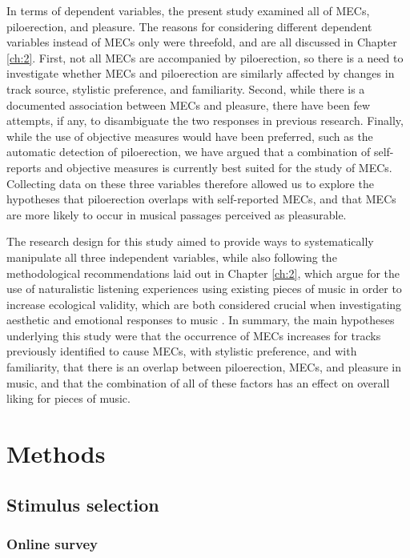 In terms of dependent variables, the present study examined all of MECs, piloerection, and pleasure. The reasons for considering different dependent variables instead of MECs only were threefold, and are all discussed in Chapter \ref{ch:2}. First, not all MECs are accompanied by piloerection, so there is a need to investigate whether MECs and piloerection are similarly affected by changes in track source, stylistic preference, and familiarity. Second, while there is a documented association between MECs and pleasure, there have been few attempts, if any, to disambiguate the two responses in previous research. Finally, while the use of objective measures would have been preferred, such as the automatic detection of piloerection, we have argued that a combination of self-reports and objective measures is currently best suited for the study of MECs. Collecting data on these three variables therefore allowed us to explore the hypotheses that piloerection overlaps with self-reported MECs, and that MECs are more likely to occur in musical passages perceived as pleasurable.

The research design for this study aimed to provide ways to systematically manipulate all three independent variables, while also following the methodological recommendations laid out in Chapter \ref{ch:2}, which argue for the use of naturalistic listening experiences using existing pieces of music in order to increase ecological validity, which are both considered crucial when investigating aesthetic and emotional responses to music \parencite{eerola2018,hargreaves2010, hodges2016}. In summary, the main hypotheses underlying this study were that the occurrence of MECs increases for tracks previously identified to cause MECs, with stylistic preference, and with familiarity, that there is an overlap between piloerection, MECs, and pleasure in music, and that the combination of all of these factors has an effect on overall liking for pieces of music.

\section{Methods}

\subsection{Stimulus selection}

\subsubsection{Online survey}

